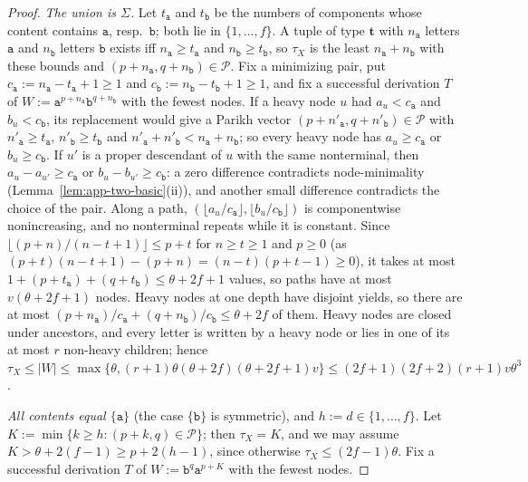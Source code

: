 \documentclass[11pt]{article}
\numberwithin{equation}{section}
\theoremstyle{plain}
\theoremstyle{definition}
\theoremstyle{remark}
\theoremstyle{plain}
\begin{document}
\begin{proof}
\emph{The union is $\Sigma$.}  Let $t_{\mathtt a}$ and $t_{\mathtt b}$ be the
numbers of components whose content contains $\mathtt a$, resp.\ $\mathtt b$; both
lie in $\{1,\dots,f\}$.  A tuple of type $\mathbf t$ with $n_{\mathtt a}$ letters $\mathtt a$
and $n_{\mathtt b}$ letters $\mathtt b$ exists iff $n_{\mathtt a}\ge t_{\mathtt a}$ and
$n_{\mathtt b}\ge t_{\mathtt b}$, so $\tau_X$ is the least
$n_{\mathtt a}+n_{\mathtt b}$ with these bounds and
$(p+n_{\mathtt a},q+n_{\mathtt b})\in\mathcal P$.  Fix a minimizing pair, put
$c_{\mathtt a}:=n_{\mathtt a}-t_{\mathtt a}+1\ge1$ and
$c_{\mathtt b}:=n_{\mathtt b}-t_{\mathtt b}+1\ge1$, and fix a successful derivation
$T$ of $W:=\mathtt a^{p+n_{\mathtt a}}\mathtt b^{q+n_{\mathtt b}}$ with the fewest
nodes.  If a heavy node $u$ had $a_u<c_{\mathtt a}$ and $b_u<c_{\mathtt b}$, its
replacement would give a Parikh vector $(p+n'_{\mathtt a},q+n'_{\mathtt b})\in\mathcal
P$ with $n'_{\mathtt a}\ge t_{\mathtt a}$, $n'_{\mathtt b}\ge t_{\mathtt b}$ and
$n'_{\mathtt a}+n'_{\mathtt b}<n_{\mathtt a}+n_{\mathtt b}$; so every heavy node has
$a_u\ge c_{\mathtt a}$ or $b_u\ge c_{\mathtt b}$.  If $u'$ is a proper descendant of
$u$ with the same nonterminal, then $a_u-a_{u'}\ge c_{\mathtt a}$ or
$b_u-b_{u'}\ge c_{\mathtt b}$: a zero difference contradicts node-minimality
(Lemma~\ref{lem:app-two-basic}(ii)), and another small difference contradicts
the choice of the pair.  Along a path, $(\lfloor a_u/c_{\mathtt a}\rfloor,
\lfloor b_u/c_{\mathtt b}\rfloor)$ is componentwise nonincreasing, and no
nonterminal repeats while it is constant.  Since
$\lfloor(p+n)/(n-t+1)\rfloor\le p+t$ for $n\ge t\ge1$ and $p\ge0$ (as $(p+t)(n-t+1)-(p+n)=(n-t)(p+t-1)\ge0$), it
takes at most $1+(p+t_{\mathtt a})+(q+t_{\mathtt b})\le\theta+2f+1$ values, so paths
have at most $v(\theta+2f+1)$ nodes.  Heavy nodes at one depth have disjoint yields,
so there are at most $(p+n_{\mathtt a})/c_{\mathtt a}+(q+n_{\mathtt b})/c_{\mathtt
b}\le\theta+2f$ of them.  Heavy nodes are closed under ancestors, and every letter
is written by a heavy node or lies in one of its at most $r$ non-heavy
children; hence
$\tau_X\le|W|\le\max\{\theta,(r+1)\theta(\theta+2f)(\theta+2f+1)v\}\le(2f+1)(2f+2)(r+1)v\theta^3$.

\emph{All contents equal $\{\mathtt a\}$} (the case $\{\mathtt b\}$ is symmetric),
and $h:=d\in\{1,\dots,f\}$.  Let $K:=\min\{k\ge h:(p+k,q)\in\mathcal P\}$; then
$\tau_X=K$, and we may assume $K>\theta+2(f-1)\ge p+2(h-1)$, since otherwise
$\tau_X\le(2f-1)\theta$.  Fix a successful derivation
$T$ of $W:=\mathtt b^q\mathtt a^{p+K}$ with the fewest nodes.


\end{proof}
\end{document}
